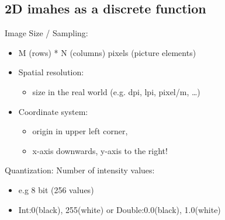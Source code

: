 \subsection{2D imahes as a discrete function}
Image Size / Sampling:
\begin{itemize}
    \item  M (rows) * N (columns) pixels (picture
    elements)
    \item Spatial resolution:
    \begin{itemize}
        \item size in the real world (e.g. dpi, lpi, pixel/m, …)
    \end{itemize}
    \item Coordinate system:
    \begin{itemize}
        \item origin in upper left corner,
        \item x-axis downwards, y-axis to the right!
    \end{itemize}
\end{itemize}
Quantization: Number of intensity values:
\begin{itemize}
    \item e.g 8 bit (256 values)
    \item Int:{0(black), 255(white)} or Double:{0.0(black), 1.0(white)}
\end{itemize}
